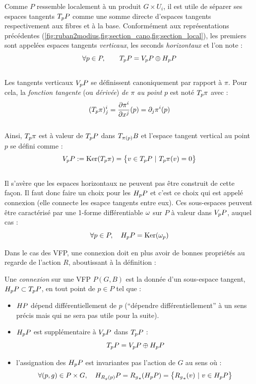 Comme $P$ ressemble localement à un produit $G\times U_i$, il est utile de séparer ses espaces tangents $\tg[p]{P}$ comme une somme directe d'espaces tangents respectivement aux fibres et à la base. Conformément aux représentations précédentes (\cref{fig:ruban2modius,fig:section_cano,fig:section_local}), les premiers sont appelées espaces tangents \emph{verticaux}, les seconds \emph{horizontaux} et l'on note :
\[\forall p\in P,\qquad \tg[p]{P} = \vg[p]{P} \oplus \hg[p]{P}\]
\\
Les tangents verticaux $\vg[p]{P}$ se définissent canoniquement par rapport à $\pi$. Pour cela, la \emph{fonction tangente} (ou \emph{dérivée}) \emph{de $\pi$ au point} $p$ est noté $\tg[p]{\pi}$ avec :
\[(\tg[p]{\pi})^i_j = \frac{\partial \pi^i}{\partial x^j}(p) = \partial_j\pi^i(p)\]
\\
Ainsi, $\tg[p]{\pi}$ est à valeur de $\tg[p]{P}$ dans $\tg[\pi(p)]{B}$ et l'espace tangent vertical au point $p$ se défini comme :
\[\vg[p]{P} \defeq \Ker (\tg[p]{\pi}) = \big\{ v\in\tg[p]{P}\ |\ \tg[p]{\pi}(v)=0 \big\}\]
\\ 
Il s'avère que les espaces horizontaux ne peuvent pas être construit de cette façon. Il faut donc faire un choix pour les $\hg[p]{P}$ et c'est ce choix qui est appelé connexion (elle connecte les esapce tangents entre eux).
Ces sous-espaces peuvent être caractérisé par une 1-forme différentiable $\conn$ sur $P$ à valeur dans $\vg[p]{P}$, auquel cas :
\[\forall p\in P,\quad \hg[p]{P} = \Ker(\conn_p)\]
\skipl

Dans le cas des VFP, une connexion doit en plus avoir de bonnes propriétés au regarde de l'action $R$, aboutissant à la définition :
\begin{definition} \label{def:connexion2VFP}
	Une \emph{connexion} sur une VFP $P(G,B)$ est la donnée d'un sous-espace tangent, $\hg[p]{P}\subset \tg[p]{P}$, en tout point de $p\in P$ tel que :
	\begin{itemize}
		
		\item $\hg{P}$ dépend différentiellement de $p$ (``dépendre différentiellement'' à un sens précis mais qui ne sera pas utile pour la suite).
		
		\item $\hg[p]{P}$ est supplémentaire à $\vg[p]{P}$ dans $\tg[p]{P}$ :
		\begin{equation}\label{eq:TP=V+H}
			\tg[p]{P} = \vg[p]{P} \oplus \hg[p]{P}
		\end{equation}
		
		\item l'assignation des $\hg[p]{P}$ est invariantes pas l'action de $G$ au sens où :
		\begin{equation}\label{eq:conn_G-inv}
			\forall (p,g)\in P\times G,\quad \hg[R_g(p)]{P} = {R_g}_* (\hg[p]{P}) = \big\{{R_g}_*(v)\ |\ v \in \hg[p]{P} \big\}
		\end{equation}
	\end{itemize}
\end{definition}
\skipl

